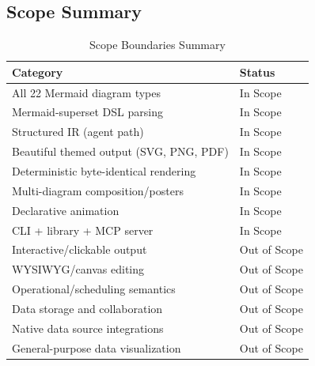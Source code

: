 \subsection{Scope Summary}

\begin{table}[h]
\centering
\caption{Scope Boundaries Summary}
\begin{tabularx}{\textwidth}{lX}
\toprule
\textbf{Category} & \textbf{Status} \\
\midrule
All 22 Mermaid diagram types & In Scope \\
Mermaid-superset DSL parsing & In Scope \\
Structured IR (agent path) & In Scope \\
Beautiful themed output (SVG, PNG, PDF) & In Scope \\
Deterministic byte-identical rendering & In Scope \\
Multi-diagram composition/posters & In Scope \\
Declarative animation & In Scope \\
CLI + library + MCP server & In Scope \\
\midrule
Interactive/clickable output & Out of Scope \\
WYSIWYG/canvas editing & Out of Scope \\
Operational/scheduling semantics & Out of Scope \\
Data storage and collaboration & Out of Scope \\
Native data source integrations & Out of Scope \\
General-purpose data visualization & Out of Scope \\
\bottomrule
\end{tabularx}
\end{table}
